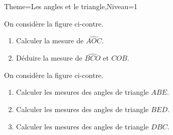 \documentclass[a4paper,12pt]{article}
\begin{document}
\begin{Maquette}[Fiche]{Theme=Les angles et le triangle,Niveau=1}
\begin{exercice}
\begin{minipage}{0.6\linewidth}
On considère la figure ci-contre.
\begin{enumerate}
\item Calculer la mesure de $\widehat{AOC}$.
\item Déduire la mesure de $\widehat{BCO}$ et $COB$.
\end{enumerate}
\end{minipage}%
\begin{minipage}{0.4\linewidth}
\end{minipage}
\end{exercice}

\begin{exercice}
\begin{minipage}{0.6\linewidth}
On considère la figure ci-contre.
\begin{enumerate}
\item Calculer les mesures des angles de triangle $ABE$.
\item Calculer les mesures des angles de triangle $BED$.
\item Calculer les mesures des angles de triangle $DBC$.
\end{enumerate}
\end{minipage}%
\begin{minipage}{0.4\linewidth}
\end{minipage}
\end{exercice}


\end{Maquette}
\end{document}
